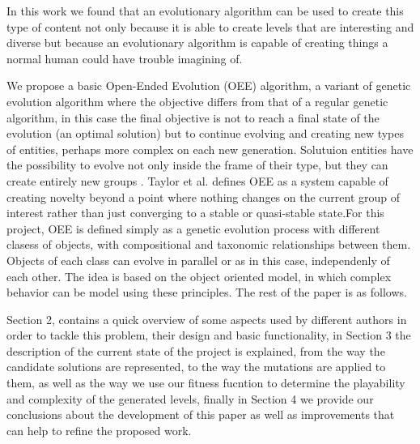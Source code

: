 \documentclass[conference]{IEEEtran}
\begin{document}
    In this work we found that an evolutionary algorithm can be used to create 
    this type of content not only because it is able to create levels that are interesting 
    and diverse but because an evolutionary algorithm is capable of creating things a 
    normal human could have trouble imagining of.
    
    
    
    We propose a basic Open-Ended Evolution (OEE) algorithm, a variant of genetic
    evolution algorithm where the objective differs from that of a regular genetic
    algorithm,  in this case the final objective is not to reach a final state of
    the evolution (an optimal solution) but to continue evolving and creating new
    types of entities, perhaps more complex on each new generation. Solutuion
    entities have the possibility to evolve not only inside the frame of their type,
    but  they can create entirely new groups \cite{Standish2003}. Taylor et al.
    \cite{Taylor2016,Taylor} defines OEE as a system capable of creating novelty
    beyond a point where nothing changes on the current group of interest rather
    than just converging to a stable or quasi-stable state.For this project, OEE is
    defined simply as a genetic evolution process with different clasess of objects,
    with compositional and taxonomic relationships between them. Objects of each
    class can evolve in parallel or as in this case, independenly of each other. The
    idea is based on the object oriented model, in which complex behavior can be
    model using these principles. The rest of the paper is as follows.
    
    
    Section 2, contains a quick overview of some aspects used by different authors
    in order to tackle this problem, their design and basic functionality, in
    Section 3 the description of the current state of the project is explained, from
    the way the candidate solutions are represented, to the way the mutations are applied 
    to them, as well as the way we use our fitness fucntion to determine the playability
    and complexity of the generated levels, 
    finally in Section 4 we provide our conclusions about the development of this
    paper as well as improvements that can help to refine the proposed work. 
\end{document}
